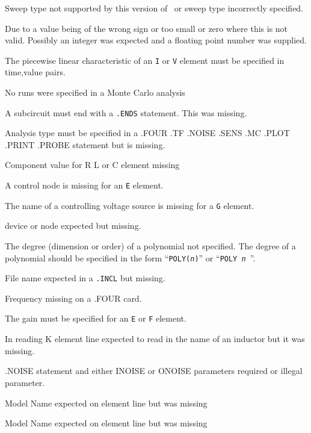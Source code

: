 Sweep type not supported by this version of \spice\ or sweep type
incorrectly specified.

Due to a value being of the wrong sign or too small or zero where this is not valid.
Possibly an integer was expected and a floating point number was supplied.

The piecewise linear characteristic of an {\tt I} or {\tt V}
element must be specified in time,value pairs.

No runs were specified in a Monte Carlo analysis

A subcircuit must end with a {\tt .ENDS} statement. This was missing.

Analysis type must be specified in a .FOUR .TF .NOISE .SENS .MC .PLOT
.PRINT .PROBE statement but is missing.

Component value for R L or C element missing

A control node is missing for an {\tt E} element.

The name of a controlling voltage source is missing for a {\tt G} element.

device or node expected but missing.

The degree (dimension or order) of a polynomial not specified.
The degree of a polynomial should be specified in the form
``{\tt POLY({\it n})}'' or ``{\tt POLY~{\it n}~}''.

File name expected in a {\tt .INCL} but missing.

Frequency missing on a .FOUR card.

The gain must be specified for an {\tt E} or {\tt F} element.

In reading K element line expected to read in the name of
an  inductor but it was missing.

.NOISE statement and either INOISE or ONOISE parameters required
or illegal parameter.

Model Name expected on element line but was missing

Model Name expected on element line but was missing

